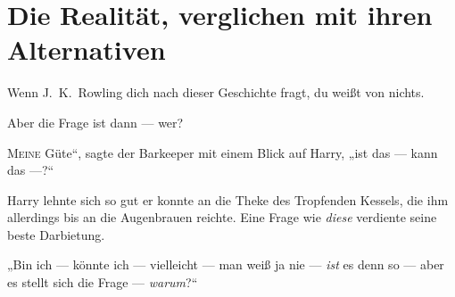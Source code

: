 \chapter{Die Realität, verglichen mit ihren Alternativen}

\begin{chapterOpeningAuthorNote}
Wenn J.~K.~Rowling dich nach dieser Geschichte fragt, du weißt von nichts.
\end{chapterOpeningAuthorNote}
\begin{chapterOpeningQuote}
Aber die Frage ist dann — wer?
\end{chapterOpeningQuote}

\lettrine[ante=„]{M}{eine} Güte“, sagte der Barkeeper mit einem Blick auf Harry, „ist das — kann das —?“

Harry lehnte sich so gut er konnte an die Theke des Tropfenden Kessels, die ihm allerdings bis an die Augenbrauen reichte. Eine Frage wie \emph{diese} verdiente seine beste Darbietung.

„Bin ich — könnte ich — vielleicht — man weiß ja nie — \emph{ist} es denn so — aber es stellt sich die Frage — \emph{warum}?“

